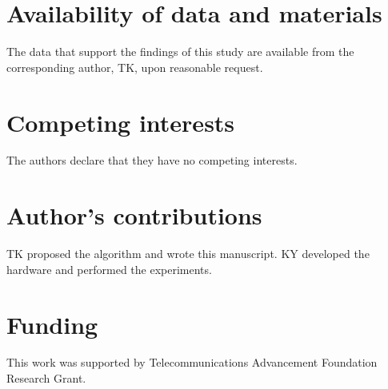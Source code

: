 \documentclass{bmcart}
\begin{document}
\begin{backmatter}

\section*{Availability of data and materials}
The data that support the findings of this study are available from the corresponding author, TK, upon reasonable request.

\section*{Competing interests}
The authors declare that they have no competing interests.

\section*{Author's contributions}
TK proposed the algorithm and wrote this manuscript.
KY developed the hardware and performed the experiments.

\section*{Funding}
This work was supported by Telecommunications Advancement Foundation Research Grant.




\end{backmatter}
\end{document}
